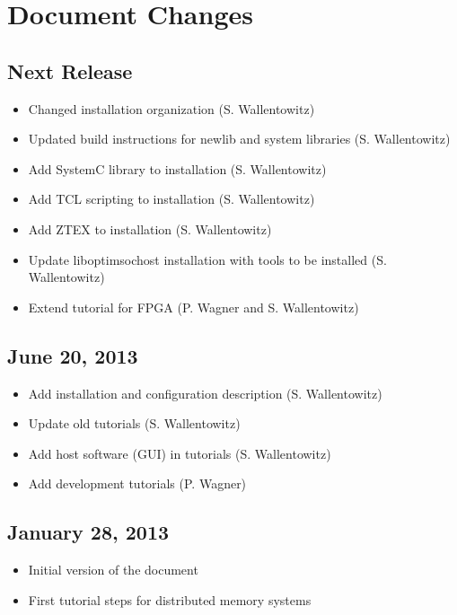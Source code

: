 \section*{Document Changes}


\subsection*{Next Release} %
\begin{itemize}
\item Changed installation organization (S. Wallentowitz)
\item Updated build instructions for newlib and system libraries (S. Wallentowitz)
\item Add SystemC library to installation (S. Wallentowitz)
\item Add TCL scripting to installation (S. Wallentowitz)
\item Add ZTEX to installation (S. Wallentowitz)
\item Update liboptimsochost installation with tools to be installed
  (S. Wallentowitz)
\item Extend tutorial for FPGA (P. Wagner and S. Wallentowitz)
\end{itemize}

\subsection*{June 20, 2013}
\begin{itemize}
\item Add installation and configuration description (S. Wallentowitz)
\item Update old tutorials (S. Wallentowitz)
\item Add host software (GUI) in tutorials (S. Wallentowitz)
\item Add development tutorials (P. Wagner) 
\end{itemize}

\subsection*{January 28, 2013}
\begin{itemize}
\item Initial version of the document
\item First tutorial steps for distributed memory systems
\end{itemize}